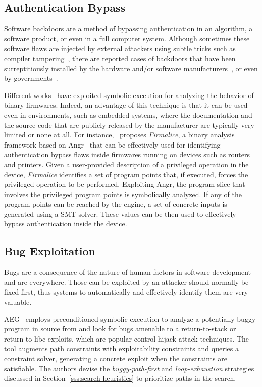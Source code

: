 \subsection{Authentication Bypass}
\label{ss:auth-bypass}
Software backdoors are a method of bypassing authentication in an algorithm, a software product, or even in a full computer system. Although sometimes these software flaws are injected by external attackers using subtle tricks such as compiler tampering~\cite{KRS-TR74}, there are reported cases of backdoors that have been surreptitiously installed by the hardware and/or software manufacturers~\cite{CZF-USEC14}, or even by governments~\cite{NSA-BACKDOOR}. 

Different works~\cite{ZBF-NDSS14,DMR-USEC13,FIRMALICE-NDSS15} have exploited symbolic execution for analyzing the behavior of binary firmwares. Indeed, an advantage of this technique is that it can be used even in environments, such as embedded systems, where the documentation and the source code that are publicly released by the manufacturer are typically very limited or none at all. For instance,~\cite{FIRMALICE-NDSS15} proposes {\em Firmalice}, a binary analysis framework based on {\sc Angr}~\cite{ANGR-SSP16} that can be effectively used for identifying authentication bypass flaws inside firmwares running on devices such as routers and printers. Given a user-provided description of a privileged operation in the device, {\em Firmalice} identifies a set of program points that, if executed, forces the privileged operation to be performed. Exploiting {\sc Angr}, the program slice that involves the privileged program points is symbolically analyzed. If any of the program points can be reached by the engine, a set of concrete inputs is generated using a SMT solver. These values can be then used to effectively bypass authentication inside the device.

\subsection{Bug Exploitation}
\label{ss:bug-exploitation}
Bugs are a consequence of the nature of human factors in software development and are everywhere. Those can be exploited by an attacker should normally be fixed first, thus systems to automatically and effectively identify them are very valuable.

{\sc AEG}~\cite{AEG-NDSS11} employs preconditioned symbolic execution to analyze a potentially buggy program in source from and look for bugs amenable to a return-to-stack or return-to-libc exploits, which are popular control hijack attack techniques. The tool augments path constraints with exploitability constraints and queries a constraint solver, generating a concrete exploit when the constraints are satisfiable. The authors devise the {\em buggy-path-first} and {\em loop-exhaustion} strategies discussed in Section~\ref{sss:search-heuristics} to prioritize paths in the search. 


